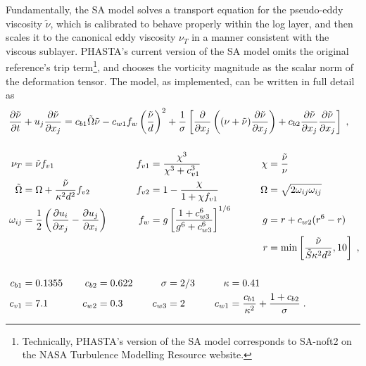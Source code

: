 \documentclass[11pt]{article}
\begin{document}
Fundamentally, the SA model solves a transport equation for the pseudo-eddy viscosity $\tilde{\nu}$, which is calibrated to behave properly within the log layer, and then scales it to the canonical eddy viscosity $\nu_T$ in a manner consistent with the viscous sublayer. PHASTA's current version of the SA model omits the original reference's trip term\footnote{Technically, PHASTA's version of the SA model corresponds to SA-noft2 on the NASA Turbulence Modelling Resource website.}, and chooses the vorticity magnitude as the scalar norm of the deformation tensor. The model, as implemented, can be written in full detail as
\begin{align}
	\phantom{W_{ij}}
	&\begin{aligned}
		\mathllap{\pp{\tilde{\nu}}{t}}
		&+ u_j \pp{\tilde{\nu}}{x_j}
		=
		c_{b1} \tilde{\Omega} \tilde{\nu}
		-
		c_{w1} f_w \left( \frac{\tilde{\nu}}{d} \right)^2
		+
		\frac{1}{\sigma} 
		\left[
		\pp{}{x_j}
			\left( (\nu + \tilde{\nu}) \pp{\tilde{\nu}}{x_j} \right)
			+ c_{b2} \pp{\tilde{\nu}}{x_j} \pp{\tilde{\nu}}{x_j}
		\right]
		\;,
		\label{eq:SA_transport}
	\end{aligned} \\[0.5cm]
	&\begin{aligned}
		\mathllap{\nu_T} &= \tilde{\nu} f_{v1}
		&\qquad
		f_{v1} &= \frac{\chi^3}{\chi^3 + c_{v1}^3}
		&\qquad
		\chi &= \frac{\tilde{\nu}}{\nu}
		\\
		\mathllap{\tilde{\Omega}} &= \Omega + \frac{\tilde{\nu}}{\kappa^2 d^2} f_{v2}
		&\qquad
		f_{v2} &= 1 - \frac{\chi}{1 + \chi f_{v1}}
		&\qquad
		\Omega &= \sqrt{2 \omega_{ij} \omega_{ij}}
		\\
		\mathllap{\omega_{ij}} &= \frac{1}{2} \left( \pp{u_i}{x_j} - \pp{u_j}{x_i} \right)
		&\qquad
		f_w &= g \left[ \frac{1 + c_{w3}^6}{g^6 + c_{w3}^6} \right]^{1/6}
		&\qquad
		g &= r + c_{w2}(r^6 - r)
		\\
		&&&&
		r &= \min \left[ \frac{\tilde{\nu}}{\tilde{S} \kappa^2 d^2}, 10 \right]
		\;,
		\label{eq:SA_definitions}
	\end{aligned} \\[0.5cm]
	&\begin{aligned}
		\mathllap{c_{b1}} &= 0.1355
		&\quad
		c_{b2} &= 0.622
		&\quad
		\sigma &= 2/3
		&\quad
		\kappa &= 0.41
		\\
		\mathllap{c_{v1}} &= 7.1
		&\quad
		c_{w2} &= 0.3
		&\quad
		c_{w3} &= 2
		&\quad
		c_{w1} &= \frac{c_{b1}}{\kappa^2} + \frac{1 + c_{b2}}{\sigma}
		\;.
		\label{eq:SA_constants}
	\end{aligned}
\end{align}
\end{document}
